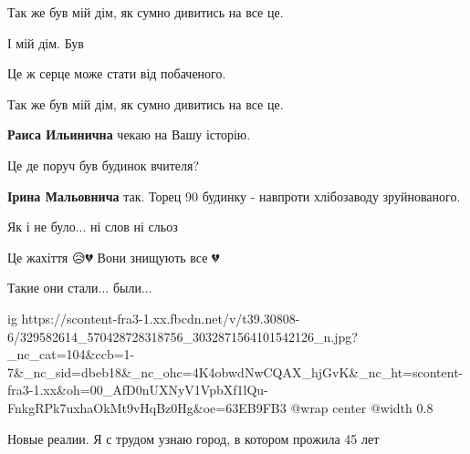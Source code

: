  
 
 
 
 

\qqSecCmt


Так же був мій дім, як сумно дивитись на все це.

І мій дім. Був


Це ж серце може стати від побаченого.


Так же був мій дім, як сумно дивитись на все це.

\begin{itemize} %
\textbf{Раиса Ильинична} чекаю на Вашу історію.
\end{itemize} %


Це де поруч був будинок вчителя?

\begin{itemize} %
\textbf{Ірина Мальовнича} так. Торец 90 будинку - навпроти хлібозаводу зруйнованого.
\end{itemize} %


Як і не було... ні слов ні сльоз


Це жахіття 😥💔 Вони знищують все 💔


Такие они стали... были...

\ifcmt
  ig https://scontent-fra3-1.xx.fbcdn.net/v/t39.30808-6/329582614_570428728318756_3032871564101542126_n.jpg?_nc_cat=104&ccb=1-7&_nc_sid=dbeb18&_nc_ohc=4K4obwdNwCQAX_hjGvK&_nc_ht=scontent-fra3-1.xx&oh=00_AfD0nUXNyV1VpbXf1lQu-FnkgRPk7uxhaOkMt9vHqBz0Hg&oe=63EB9FB3
  @wrap center
  @width 0.8
\fi


Новые реалии. Я с трудом узнаю город, в котором прожила 45 лет

